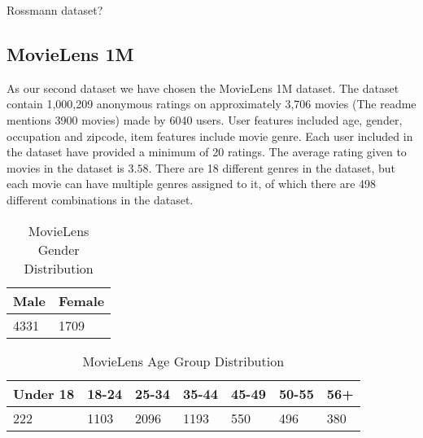 Rossmann dataset?

\subsection{MovieLens 1M}

As our second dataset we have chosen the MovieLens 1M dataset. The dataset contain 1,000,209 anonymous ratings on approximately 3,706 movies (The readme mentions 3900 movies) made by 6040 users. User features included age, gender, occupation and zipcode, item features include movie genre. Each user included in the dataset have provided a minimum of 20 ratings. The average rating given to movies in the dataset is $3.58$. There are 18 different genres in the dataset, but each movie can have multiple genres assigned to it, of which there are 498 different combinations in the dataset.

\begin{table}
\centering
\begin{tabular}{|l|l|}
\hline
Male & Female \\ \hline
4331 & 1709 \\ \hline
\end{tabular}
\caption{MovieLens Gender Distribution}
\end{table}

\begin{table}
\centering
\begin{tabular}{|l|l|l|l|l|l|l|}
\hline
Under 18 & 18-24 & 25-34 	& 35-44 	& 45-49 & 50-55 & 56+ \\ \hline
222		 &	1103 &	2096	&	1193	& 550	& 496	& 380 \\ \hline
\end{tabular}
\caption{MovieLens Age Group Distribution}
\end{table}

